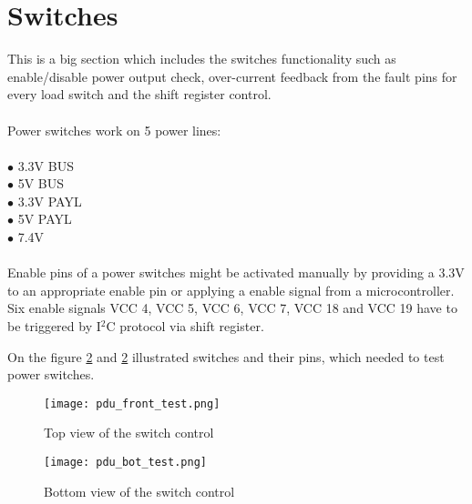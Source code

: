 \section{Switches}
This is a big section which includes the switches functionality such as enable/disable power output check, over-current feedback from the fault pins for every load switch  and the shift register control. \\
\\
Power switches work on 5 power lines:\\ \\
$\bullet$ 3.3V BUS\\
$\bullet$ 5V BUS\\
$\bullet$ 3.3V PAYL\\
$\bullet$ 5V PAYL\\
$\bullet$ 7.4V\\ \\
Enable pins of a power switches might be activated manually by providing a 3.3V to an appropriate enable pin or applying a enable signal from a microcontroller.  Six enable signals VCC 4, VCC 5, VCC 6, VCC 7, VCC 18 and VCC 19 have to be triggered by I$^2$C protocol via shift register.

On the figure \ref{fig: pdu_test_front}  and \ref{fig: pdu_test_front} illustrated switches and their pins, which needed to test power switches.

\begin{figure}[h]
	\centering
	\texttt{[image: pdu\_front\_test.png]}
	\caption{Top view of the switch control}
	\label{fig: pdu_test_front}
\end{figure} 

\begin{figure}[h]
	\centering
	\texttt{[image: pdu\_bot\_test.png]}
	\caption{Bottom view of the switch control}
	\label{fig: pdu_test_front}
\end{figure}

